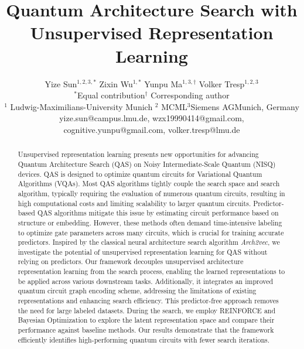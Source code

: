 \documentclass{article} %
\title{Quantum Architecture Search with \\ Unsupervised Representation Learning}
\author{Yize Sun$^{1,2,3,*}$ \qquad Zixin Wu$^{1,*}$ \qquad Yunpu Ma$^{1,3,\dag}$ \qquad Volker Tresp$^{1,2,3}$ \\$^*$Equal contribution\qquad $^{\dag}$ Corresponding author\\ $^{1}$ Ludwig-Maximilians-University Munich \qquad $^2$ MCML\qquad $^{3}$Siemens AG\quad Munich, Germany\\
yize.sun@campus.lmu.de, \qquad wzx19990414@gmail.com,\\ cognitive.yunpu@gmail.com, \qquad volker.tresp@lmu.de}
\begin{document}
\maketitle

\begin{abstract}
Unsupervised representation learning presents new opportunities for advancing Quantum Architecture Search (QAS) on Noisy Intermediate-Scale Quantum (NISQ) devices. QAS is designed to optimize quantum circuits for Variational Quantum Algorithms (VQAs). Most QAS algorithms tightly couple the search space and search algorithm, typically requiring the evaluation of numerous quantum circuits, resulting in high computational costs and limiting scalability to larger quantum circuits. Predictor-based QAS algorithms mitigate this issue by estimating circuit performance based on structure or embedding. However, these methods often demand time-intensive labeling to optimize gate parameters across many circuits, which is crucial for training accurate predictors. Inspired by the classical neural architecture search algorithm \textit{Arch2vec}, we investigate the potential of unsupervised representation learning for QAS without relying on predictors. Our framework decouples unsupervised architecture representation learning from the search process, enabling the learned representations to be applied across various downstream tasks. Additionally, it integrates an improved quantum circuit graph encoding scheme, addressing the limitations of existing representations and enhancing search efficiency. This predictor-free approach removes the need for large labeled datasets. During the search, we employ REINFORCE and Bayesian Optimization to explore the latent representation space and compare their performance against baseline methods. Our results demonstrate that the framework efficiently identifies high-performing quantum circuits with fewer search iterations.
\end{abstract}
\end{document}
